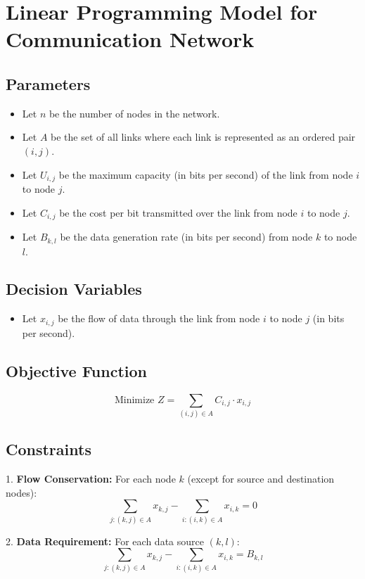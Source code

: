 \documentclass{article}
\begin{document}
\section*{Linear Programming Model for Communication Network}

\subsection*{Parameters}
\begin{itemize}
    \item Let \( n \) be the number of nodes in the network.
    \item Let \( A \) be the set of all links where each link is represented as an ordered pair \( (i, j) \).
    \item Let \( U_{i,j} \) be the maximum capacity (in bits per second) of the link from node \( i \) to node \( j \).
    \item Let \( C_{i,j} \) be the cost per bit transmitted over the link from node \( i \) to node \( j \).
    \item Let \( B_{k,l} \) be the data generation rate (in bits per second) from node \( k \) to node \( l \).
\end{itemize}

\subsection*{Decision Variables}
\begin{itemize}
    \item Let \( x_{i,j} \) be the flow of data through the link from node \( i \) to node \( j \) (in bits per second).
\end{itemize}

\subsection*{Objective Function}
\[
\text{Minimize } Z = \sum_{(i,j) \in A} C_{i,j} \cdot x_{i,j}
\]

\subsection*{Constraints}
1. \textbf{Flow Conservation:} For each node \( k \) (except for source and destination nodes):
   \[
   \sum_{j: (k,j) \in A} x_{k,j} - \sum_{i: (i,k) \in A} x_{i,k} = 0
   \]

2. \textbf{Data Requirement:} For each data source \( (k, l) \):
   \[
   \sum_{j: (k,j) \in A} x_{k,j} - \sum_{i: (i,k) \in A} x_{i,k} = B_{k,l}
   \]
\end{document}
